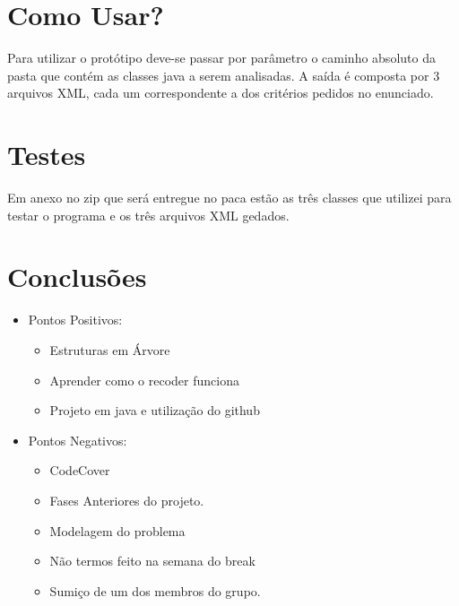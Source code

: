 \documentclass[12pt]{article} %
\begin{document}
\section{Como Usar?}
 \mbox{}

 	Para utilizar o protótipo deve-se passar por parâmetro o caminho absoluto da pasta que contém as classes java a serem analisadas. A saída é
composta por 3 arquivos XML, cada um correspondente a dos critérios pedidos no enunciado. 

\section{Testes}
\mbox{}

	Em anexo no zip que será entregue no paca estão as três classes que utilizei para testar o programa e os três arquivos XML gedados.

\section{Conclusões}
\mbox{}

\begin{itemize}
	
	\item Pontos Positivos: 
		\begin{itemize}
			\item Estruturas em Árvore
			\item Aprender como o recoder funciona
			\item Projeto em java e utilização do github
		\end{itemize}
	\item Pontos Negativos:
		\begin{itemize}
			\item CodeCover
			\item Fases Anteriores do projeto. 
			\item Modelagem do problema
			\item Não termos feito na semana do break
			\item Sumiço de um dos membros do grupo. 
		\end{itemize}
\end{itemize}
\end{document}
